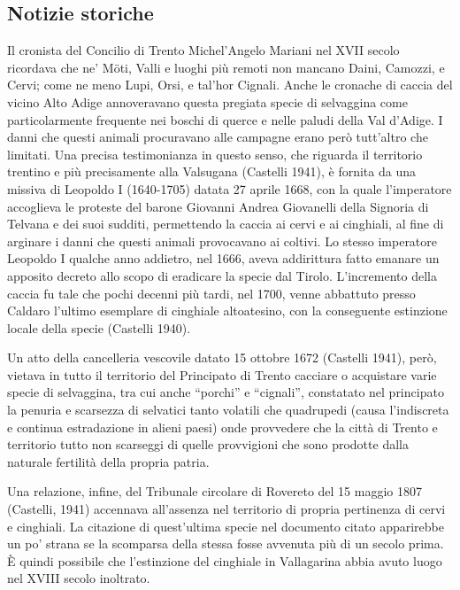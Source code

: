 \begin{multicols}{2}
\section{Notizie storiche} Il cronista del Concilio di Trento
Michel{\textquoteright}Angelo Mariani nel XVII secolo ricordava che
{\guillemotleft}ne{\textquoteright} M\"oti, Valli e luoghi pi\`u remoti
non mancano Daini, Camozzi, e Cervi; come ne meno Lupi, Orsi, e
tal{\textquoteright}hor Cignali\textit{{\guillemotright}}. Anche le
cronache di caccia del vicino Alto Adige annoveravano questa pregiata
specie di selvaggina come particolarmente frequente nei boschi di
querce e nelle paludi della Val d{\textquoteright}Adige. I danni che
questi animali procuravano alle campagne erano per\`o
tutt{\textquoteright}altro che limitati. Una precisa testimonianza in
questo senso, che riguarda il territorio trentino e pi\`u precisamente
alla Valsugana (Castelli 1941), \`e fornita da una missiva di Leopoldo
I (1640-1705) datata 27 aprile 1668, con la quale
l{\textquoteright}imperatore accoglieva le proteste del barone Giovanni
Andrea Giovanelli della Signoria di Telvana e dei suoi sudditi,
permettendo la caccia ai cervi e ai cinghiali, al fine di arginare i
danni che questi animali provocavano ai coltivi. Lo stesso imperatore
Leopoldo I qualche anno addietro, nel 1666, aveva addirittura fatto
emanare un apposito decreto allo scopo di eradicare la specie dal
Tirolo. L{\textquoteright}incremento della caccia fu tale che pochi
decenni pi\`u tardi, nel 1700, venne abbattuto presso Caldaro
l{\textquoteright}ultimo esemplare di cinghiale altoatesino, con la
conseguente estinzione locale della specie (Castelli 1940). 

Un atto della cancelleria vescovile datato 15 ottobre 1672 (Castelli
1941), per\`o, vietava in tutto il territorio del Principato di Trento
cacciare o acquistare varie specie di selvaggina, tra cui anche
{\textquotedblleft}porchi{\textquotedblright} e
{\textquotedblleft}cignali{\textquotedblright},
{\guillemotleft}constatato nel principato la penuria e scarsezza di
selvatici tanto volatili che quadrupedi (causa
l{\textquoteright}indiscreta e continua estradazione in alieni paesi)
onde provvedere che la citt\`a di Trento e territorio tutto non
scarseggi di quelle provvigioni che sono prodotte dalla naturale
fertilit\`a della propria patria{\guillemotright}. 

Una relazione, infine, del Tribunale circolare di Rovereto del 15 maggio
1807 (Castelli, 1941) accennava all{\textquoteright}assenza nel
territorio di propria pertinenza di cervi e cinghiali. La citazione di
quest{\textquoteright}ultima specie nel documento citato apparirebbe un
po{\textquoteright} strana se la scomparsa della stessa fosse avvenuta
pi\`u di un secolo prima. \`E quindi possibile che
l{\textquoteright}estinzione del cinghiale in Vallagarina abbia avuto
luogo nel XVIII secolo inoltrato.


\end{multicols}

